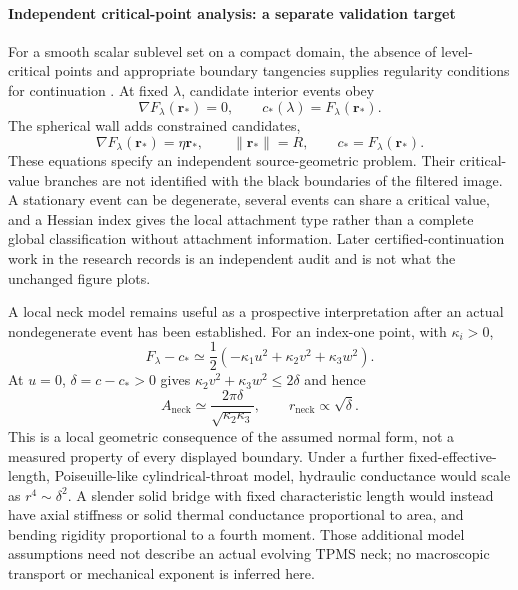 \documentclass[10pt,twocolumn]{article}
\begin{document}
\paragraph{Independent critical-point analysis: a separate validation target}
For a smooth scalar sublevel set on a compact domain, the absence of level-critical points and appropriate boundary tangencies supplies regularity conditions for continuation \cite{kg_milnor1963morse}. At fixed $\lambda$, candidate interior events obey
\begin{equation}
\nabla F_\lambda(\mathbf r_*)=0,\qquad c_*(\lambda)=F_\lambda(\mathbf r_*).
\label{suppeq:tpms_morse_discriminant}
\end{equation}
The spherical wall adds constrained candidates,
\begin{equation}
\nabla F_\lambda(\mathbf r_*)=\eta\mathbf r_*,\qquad\|\mathbf r_*\|=R,\qquad c_*=F_\lambda(\mathbf r_*).
\label{suppeq:tpms_boundary_critical}
\end{equation}
These equations specify an independent source-geometric problem. Their critical-value branches are not identified with the black boundaries of the filtered image. A stationary event can be degenerate, several events can share a critical value, and a Hessian index gives the local attachment type rather than a complete global classification without attachment information. Later certified-continuation work in the research records is an independent audit and is not what the unchanged figure plots.

A local neck model remains useful as a prospective interpretation after an actual nondegenerate event has been established. For an index-one point, with $\kappa_i>0$,
\begin{equation}
F_\lambda-c_*\simeq\frac12\left(-\kappa_1u^2+\kappa_2v^2+\kappa_3w^2\right).
\label{suppeq:tpms_local_index_one}
\end{equation}
At $u=0$, $\delta=c-c_*>0$ gives $\kappa_2v^2+\kappa_3w^2\leq2\delta$ and hence
\begin{equation}
A_{\mathrm{neck}}\simeq\frac{2\pi\delta}{\sqrt{\kappa_2\kappa_3}},\qquad r_{\mathrm{neck}}\propto\sqrt\delta.
\label{suppeq:tpms_neck_scaling}
\end{equation}
This is a local geometric consequence of the assumed normal form, not a measured property of every displayed boundary. Under a further fixed-effective-length, Poiseuille-like cylindrical-throat model, hydraulic conductance would scale as $r^4\sim\delta^2$. A slender solid bridge with fixed characteristic length would instead have axial stiffness or solid thermal conductance proportional to area, and bending rigidity proportional to a fourth moment. Those additional model assumptions need not describe an actual evolving TPMS neck; no macroscopic transport or mechanical exponent is inferred here.
\end{document}
